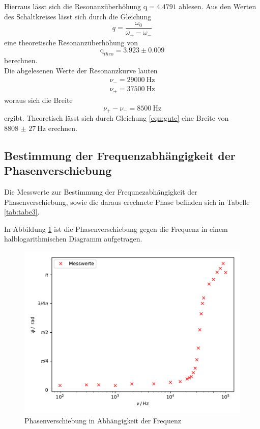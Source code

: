 \noindent Hierraus lässt sich die Resonanzüberhöhung $\text{q} = 4.4791 $ ablesen. Aus den Werten des
Schaltkreises lässt sich durch die Gleichung
\begin{equation}
  q= \frac{\omega_0}{\omega_+-\omega_-}
\end{equation}
eine theoretische Resonanzüberhöhung von
\begin{equation*}
  \text{q}_{theo} = 3.923 \pm 0.009
\end{equation*}
\noindent berechnen. \\
\noindent Die abgelesenen Werte der Resonanzkurve lauten
\begin{align*}
  \nu_- =\SI{29000}{\hertz} \\ %
  \nu_+ =\SI{37500}{\hertz} %
\end{align*}
woraus sich die Breite
\begin{equation*}
  \nu_+ - \nu_- = \SI{8500}{\hertz}
\end{equation*}
ergibt. Theoretisch lässt sich durch Gleichung \ref{eqn:gute}
eine Breite von $\SI{8808(27)}{\hertz} $ erechnen.
\subsection{Bestimmung der Frequenzabhängigkeit der Phasenverschiebung}

Die Messwerte zur Bestimmung der Frequnezabhängigkeit der Phasenverschiebung,
sowie die daraus erechnete Phase befinden sich in Tabelle \ref{tab:tabe3}.


\noindent In Abbildung \ref{fig:phase} ist die Phasenverschiebung gegen die Frequenz
in einem halblogarithmischen Diagramm aufgetragen.

\begin{figure}[H]
  \centering
  \includegraphics{plot4.pdf}
  \caption{Phasenverschiebung in Abhängigkeit der Frequenz}
  \label{fig:phase}
\end{figure}

